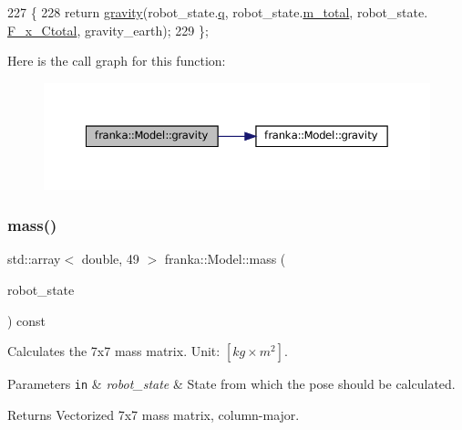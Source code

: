 \begin{DoxyCode}
227              \{
228   \textcolor{keywordflow}{return} \hyperlink{classfranka_1_1Model_a9ebf2dbe37a78071fd74d2e552125cb4}{gravity}(robot\_state.\hyperlink{structfranka_1_1RobotState_ade3335d1ac2f6c44741a916d565f7091}{q}, robot\_state.\hyperlink{structfranka_1_1RobotState_a87880d4693c8f576ebdabf00f4d4f981}{m\_total}, robot\_state.
      \hyperlink{structfranka_1_1RobotState_a72ee7362018e3c9e95e3c41e857bfd8d}{F\_x\_Ctotal}, gravity\_earth);
229 \};
\end{DoxyCode}
Here is the call graph for this function\+:
\nopagebreak
\begin{figure}[H]
\begin{center}
\leavevmode
\includegraphics[width=350pt]{classfranka_1_1Model_abe3bf8777c9476d2d089dc6b9a4f638c_cgraph}
\end{center}
\end{figure}
\mbox{\label{classfranka_1_1Model_a39eefe959a2a9155b4782b98ad766530}} 
\subsubsection{\texorpdfstring{mass()}{mass()}\hspace{0.1cm}{\footnotesize\ttfamily [1/2]}}
{\footnotesize\ttfamily std\+::array$<$ double, 49 $>$ franka\+::\+Model\+::mass (\begin{DoxyParamCaption}\item[{const \hyperlink{structfranka_1_1RobotState}{franka\+::\+Robot\+State} \&}]{robot\+\_\+state }\end{DoxyParamCaption}) const\hspace{0.3cm}{\ttfamily [noexcept]}}

Calculates the 7x7 mass matrix. Unit\+: $[kg \times m^2]$.


\begin{DoxyParams}[1]{Parameters}
\mbox{\tt in}  & {\em robot\+\_\+state} & State from which the pose should be calculated.\\
\hline
\end{DoxyParams}
\begin{DoxyReturn}{Returns}
Vectorized 7x7 mass matrix, column-\/major. 
\end{DoxyReturn}


